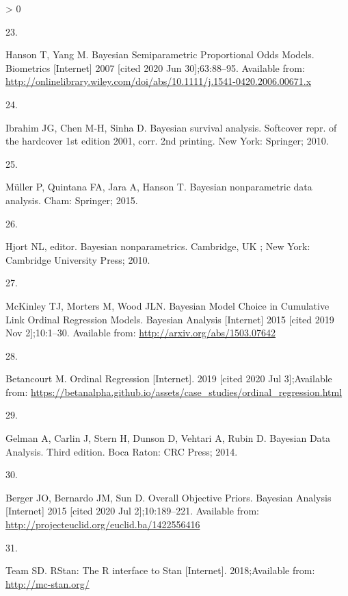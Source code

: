 \documentclass[
]{article}
\newlength{\cslhangindent}
\newlength{\csllabelwidth}
\newenvironment{CSLReferences}[2] %
 {%
  \setlength{\parindent}{0pt}
  \ifodd #1 \everypar{\setlength{\hangindent}{\cslhangindent}}\ignorespaces\fi
  \ifnum #2 > 0
  \setlength{\parskip}{#2\baselineskip}
  \fi
 }%
 {}
\newcommand{\CSLLeftMargin}[1]{\parbox[t]{\csllabelwidth}{#1}}
\newcommand{\CSLRightInline}[1]{\parbox[t]{\linewidth - \csllabelwidth}{#1}\break}
\begin{document}
\begin{CSLReferences}{0}{0}
\leavevmode\hypertarget{ref-hanson_bayesian_2007}{}%
\CSLLeftMargin{23. }
\CSLRightInline{Hanson T, Yang M. Bayesian {Semiparametric} {Proportional} {Odds} {Models}. Biometrics {[}Internet{]} 2007 {[}cited 2020 Jun 30{]};63:88--95. Available from: \url{http://onlinelibrary.wiley.com/doi/abs/10.1111/j.1541-0420.2006.00671.x}}

\leavevmode\hypertarget{ref-ibrahim_bayesian_2010}{}%
\CSLLeftMargin{24. }
\CSLRightInline{Ibrahim JG, Chen M-H, Sinha D. Bayesian survival analysis. Softcover repr. of the hardcover 1st edition 2001, corr. 2nd printing. New York: Springer; 2010. }

\leavevmode\hypertarget{ref-muller_bayesian_2015}{}%
\CSLLeftMargin{25. }
\CSLRightInline{Müller P, Quintana FA, Jara A, Hanson T. Bayesian nonparametric data analysis. Cham: Springer; 2015. }

\leavevmode\hypertarget{ref-hjort_bayesian_2010}{}%
\CSLLeftMargin{26. }
\CSLRightInline{Hjort NL, editor. Bayesian nonparametrics. Cambridge, UK ; New York: Cambridge University Press; 2010. }

\leavevmode\hypertarget{ref-mckinley_bayesian_2015}{}%
\CSLLeftMargin{27. }
\CSLRightInline{McKinley TJ, Morters M, Wood JLN. Bayesian {Model} {Choice} in {Cumulative} {Link} {Ordinal} {Regression} {Models}. Bayesian Analysis {[}Internet{]} 2015 {[}cited 2019 Nov 2{]};10:1--30. Available from: \url{http://arxiv.org/abs/1503.07642}}

\leavevmode\hypertarget{ref-betancourt_ordinal_2019}{}%
\CSLLeftMargin{28. }
\CSLRightInline{Betancourt M. Ordinal {Regression} {[}Internet{]}. 2019 {[}cited 2020 Jul 3{]};Available from: \url{https://betanalpha.github.io/assets/case_studies/ordinal_regression.html}}

\leavevmode\hypertarget{ref-gelman_bayesian_2014}{}%
\CSLLeftMargin{29. }
\CSLRightInline{Gelman A, Carlin J, Stern H, Dunson D, Vehtari A, Rubin D. Bayesian {Data} {Analysis}. Third edition. Boca Raton: CRC Press; 2014. }

\leavevmode\hypertarget{ref-berger_overall_2015}{}%
\CSLLeftMargin{30. }
\CSLRightInline{Berger JO, Bernardo JM, Sun D. Overall {Objective} {Priors}. Bayesian Analysis {[}Internet{]} 2015 {[}cited 2020 Jul 2{]};10:189--221. Available from: \url{http://projecteuclid.org/euclid.ba/1422556416}}

\leavevmode\hypertarget{ref-stan_development_team_rstan:_2018}{}%
\CSLLeftMargin{31. }
\CSLRightInline{Team SD. {RStan}: The {R} interface to {Stan} {[}Internet{]}. 2018;Available from: \url{http://mc-stan.org/}}


\end{CSLReferences}
\end{document}
